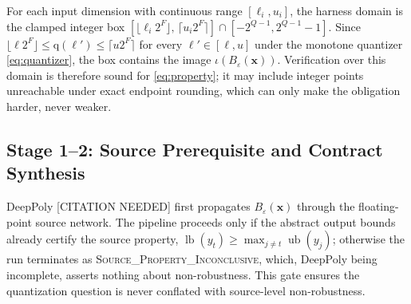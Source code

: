 \begin{lemma}
\label{lem:coverage}
For each input dimension with continuous range $[\ell_i, u_i]$, the
harness domain is the clamped integer box
$[\lfloor \ell_i 2^{F}\rfloor,\, \lceil u_i 2^{F}\rceil]
\cap [-2^{Q-1}, 2^{Q-1}\!-\!1]$. Since
$\lfloor \ell 2^{F}\rfloor \le \mathrm{q}(\ell') \le
\lceil u 2^{F}\rceil$ for every $\ell'\in[\ell,u]$ under the monotone
quantizer \eqref{eq:quantizer}, the box contains the image
$\iota(B_\varepsilon(\mathbf{x}))$. Verification over this domain is
therefore sound for \eqref{eq:property}; it may include integer points
unreachable under exact endpoint rounding, which can only make the
obligation harder, never weaker.
\end{lemma}
 
\subsection{Stage 1--2: Source Prerequisite and Contract Synthesis}
\label{sec:contracts}
 
DeepPoly [CITATION NEEDED] first propagates $B_\varepsilon(\mathbf{x})$
through the floating-point source network. The pipeline proceeds only
if the abstract output bounds already certify the source property,
$\operatorname{lb}(y_t) \ge \max_{j\ne t}\operatorname{ub}(y_j)$;
otherwise the run terminates as
\textsc{Source\_Property\_Inconclusive}, which, DeepPoly being
incomplete, asserts nothing about non-robustness. This gate ensures the
quantization question is never conflated with source-level
non-robustness.
 
